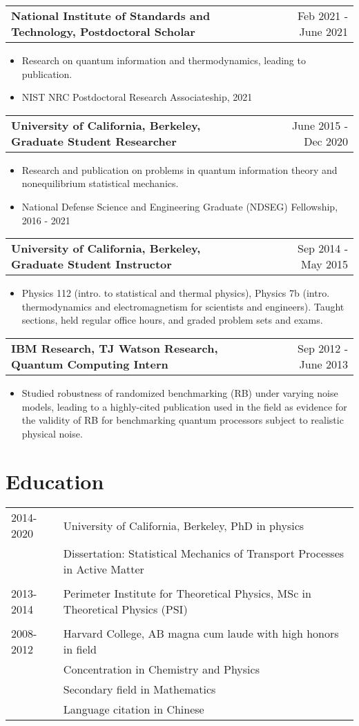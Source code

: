 \documentclass{article}
\makeatletter
\newenvironment{joblong}[2]
{
	\begin{tabularx}{\linewidth}{@{}l X r@{}}
		\textbf{#1} & \hfill &  #2 \\[3.75pt]
	\end{tabularx}
	\begin{minipage}[t]{\linewidth}
		\begin{itemize}[nosep,after=\strut, leftmargin=1em, itemsep=3pt,label=--]
		}
		{
		\end{itemize}
	\end{minipage}    
}
\makeatother
\begin{document}
	
\begin{joblong}{National Institute of Standards and Technology, Postdoctoral Scholar}{Feb 2021 - June 2021}
		\item Research on quantum information and thermodynamics, leading to publication.
		\item NIST NRC Postdoctoral Research Associateship, 2021
\end{joblong}
	
	
\begin{joblong}{University of California, Berkeley, Graduate Student Researcher}{June 2015 - Dec 2020}
\item Research and publication on problems in quantum information theory and nonequilibrium statistical mechanics.
\item National Defense Science and Engineering Graduate (NDSEG) Fellowship, 2016 - 2021
\end{joblong}

\begin{joblong}{University of California, Berkeley, Graduate Student Instructor}{Sep 2014 - May 2015}
\item Physics 112 (intro. to statistical and thermal physics), Physics 7b (intro. thermodynamics and electromagnetism for scientists and engineers). Taught sections, held regular
office hours, and graded problem sets and exams.
\end{joblong}

\begin{joblong}{IBM Research, TJ Watson Research, Quantum Computing Intern}{Sep 2012 - June 2013}
\item Studied robustness of randomized benchmarking (RB) under varying noise models, leading to a highly-cited publication used in the field as evidence for the validity of RB for benchmarking quantum processors subject to realistic physical noise.
\end{joblong}
	

	\section{Education}
	\begin{tabularx}{\linewidth}{@{}l X@{}}	
		2014-2020 & University of California, Berkeley, PhD in physics\\
		& Dissertation: Statistical Mechanics of Transport Processes in Active Matter\\
		\\		
		2013-2014 & Perimeter Institute for Theoretical Physics, MSc in Theoretical Physics (PSI)\\
		\\
		2008-2012 & Harvard College, AB magna cum laude with high honors in field\\
		& Concentration in Chemistry and Physics\\
		& Secondary field in Mathematics\\
		& Language citation in Chinese
	\end{tabularx}
	
\end{document}
